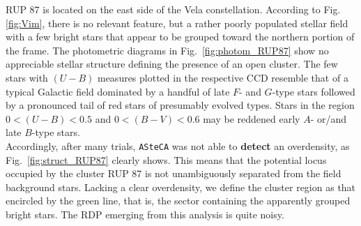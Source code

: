 \documentclass[draft]{aa}
\begin{document}
RUP 87 is located on the east side of the Vela constellation. According to Fig.
\ref{fig:Vim}, there is no relevant feature, but a rather
poorly populated stellar field with a few bright stars
that appear to be grouped  toward the northern portion of the frame.
The photometric diagrams in Fig.~\ref{fig:photom_RUP87} show no appreciable
stellar structure defining the presence of an open cluster.
The few stars with $(U-B)$ measures plotted in the respective CCD
resemble that of a typical Galactic field dominated by a handful of late $F$-
and $G$-type stars followed by a pronounced tail of red stars of presumably
evolved types. Stars in the region $0<(U-B)<0.5$ and $0<(B-V)<0.6$ may be
reddened early $A$- or/and late $B$-type stars.\\

Accordingly, after many trials, \texttt{ASteCA} was not able to \textbf{detect}
an overdensity, as Fig.~\ref{fig:struct_RUP87} clearly shows.
This means that the potential locus occupied by the cluster RUP 87 is not
unambiguously separated from the field background stars.
Lacking a clear overdensity, we define the cluster region as that encircled by
the green line, that is, the sector containing the apparently grouped bright
stars. The RDP emerging from this analysis is quite noisy.
\end{document}
